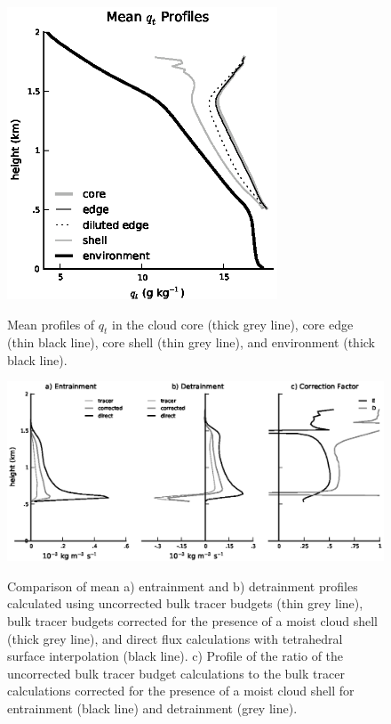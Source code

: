 \documentclass[12pt]{article}
\begin{document}
\begin{figure}[t]
  \noindent\includegraphics[width=19pc,angle=0]{./figures/shell_edge_profiles_core.eps}\\
  \caption{Mean profiles of $q_t$ in the cloud core (thick grey line), core 
edge (thin black line), core shell (thin grey line), and environment (thick 
black line).}\label{fig:shell_edge_profiles}
\end{figure}

\begin{figure}[t]
  \noindent\includegraphics[width=40pc,angle=0]{./figures/corrected_entrainment_core.eps}\\
  \caption{Comparison of mean a) entrainment and b) detrainment profiles 
calculated using uncorrected bulk tracer budgets (thin grey line), bulk tracer 
budgets corrected for the presence of a moist cloud shell (thick grey line), and
direct flux calculations with tetrahedral surface interpolation (black line).
c) Profile of the ratio of the uncorrected bulk tracer budget calculations to
the bulk tracer calculations corrected for the presence of a moist cloud shell
for entrainment (black line) and detrainment (grey line).
}\label{fig:corrected_entrainment}
\end{figure}
\end{document}
